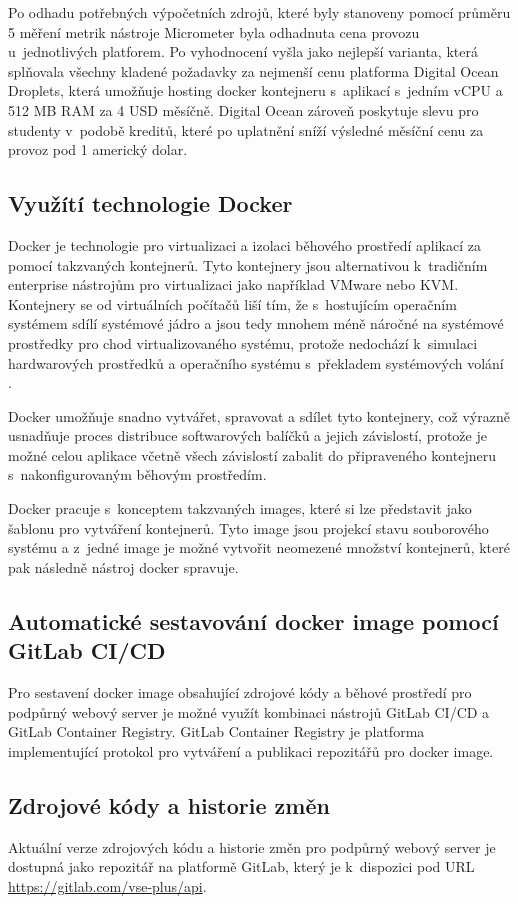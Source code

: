 Po odhadu potřebných výpočetních zdrojů, které byly stanoveny pomocí průměru 5 měření metrik nástroje Micrometer byla odhadnuta cena provozu u~jednotlivých platforem. Po vyhodnocení vyšla jako nejlepší varianta, která splňovala všechny kladené požadavky za nejmenší cenu platforma Digital Ocean Droplets, která umožňuje hosting docker kontejneru s~aplikací s~jedním vCPU a 512 MB RAM za 4 USD měsíčně. Digital Ocean zároveň poskytuje slevu pro studenty v~podobě kreditů, které po uplatnění sníží výsledné měsíční cenu za provoz pod 1 americký dolar.  


\subsection{Využítí technologie Docker}\label{sec:docker}

Docker je technologie pro virtualizaci a izolaci běhového prostředí aplikací za pomocí takzvaných kontejnerů. Tyto kontejnery jsou alternativou k~tradičním enterprise nástrojům pro virtualizaci jako například VMware nebo KVM. Kontejnery se od virtuálních počítačů liší tím, že s~hostujícím operačním systémem sdílí systémové jádro a jsou tedy mnohem méně náročné na systémové prostředky pro chod virtualizovaného systému, protože nedochází k~simulaci hardwarových prostředků a operačního systému s~překladem systémových volání \cite[kap. 1]{kane_docker_2018}.

Docker umožňuje snadno vytvářet, spravovat a sdílet tyto kontejnery, což výrazně usnadňuje proces distribuce softwarových balíčků a jejich závislostí, protože je možné celou aplikace včetně všech závislostí zabalit do připraveného kontejneru s~nakonfigurovaným běhovým prostředím. 

Docker pracuje s~konceptem takzvaných images, které si lze představit jako šablonu pro vytváření kontejnerů. Tyto image jsou projekcí stavu souborového systému a z~jedné image je možné vytvořit neomezené množství kontejnerů, které pak následně nástroj docker spravuje. 

\subsection{Automatické sestavování docker image pomocí GitLab CI/CD}

Pro sestavení docker image obsahující zdrojové kódy a běhové prostředí pro podpůrný webový server je možné využít kombinaci nástrojů GitLab CI/CD a GitLab Container Registry. GitLab Container Registry je platforma implementující protokol pro vytváření a publikaci repozitářů pro docker image.

\subsection{Zdrojové kódy a historie změn}

Aktuální verze zdrojových kódu a historie změn pro podpůrný webový server je dostupná jako repozitář na platformě GitLab, který je k~dispozici pod URL \url{https://gitlab.com/vse-plus/api}.